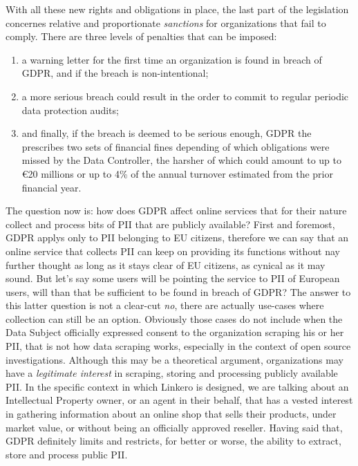 With all these new rights and obligations in place, the last part of the
legislation concernes relative and proportionate \emph{sanctions} for
organizations that fail to comply. There are three levels of penalties that can
be imposed:
\begin{enumerate}
  \item a warning letter for the first time an organization is found in breach
  of GDPR, and if the breach is non-intentional;
  \item a more serious breach could result in the order to commit to regular
  periodic data protection audits;
  \item and finally, if the breach is deemed to be serious enough, GDPR the
  prescribes two sets of financial fines depending of which obligations were
  missed by the Data Controller, the harsher of which could amount to up to
  \euro20 millions or up to 4\% of the annual turnover estimated from the
  prior financial year.
\end{enumerate}

The question now is: how does GDPR affect online services that for their
nature collect and process bits of PII that are publicly available? First and
foremost, GDPR applys only to PII belonging to EU citizens, therefore we can say
that an online service that collects PII can keep on providing its functions
without nay further thought as long as it stays clear of EU citizens, as cynical
as it may sound. But let's say some users will be pointing the service to PII of
European users, will than that be sufficient to be found in breach of GDPR? The
answer to this latter question is not a clear-cut \emph{no}, there are actually
use-cases where collection can still be an option. Obviously those cases do not
include when the Data Subject officially expressed consent to the organization
scraping his or her PII, that is not how data scraping works, especially in the
context of open source investigations. Although this may be a theoretical
argument, organizations may have a \emph{legitimate interest} in scraping,
storing and processing publicly available PII. In the specific context in which
Linkero is designed, we are talking about an Intellectual Property owner, or an
agent in their behalf, that has a vested interest in gathering information about
an online shop that sells their products, under market value, or without being
an officially approved reseller. Having said that, GDPR definitely limits and
restricts, for better or worse, the ability to extract, store and process public
PII.

